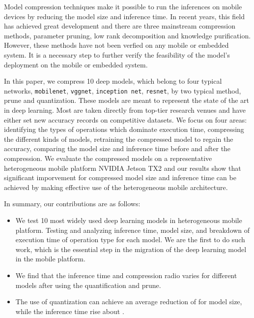 Model compression techniques make it possible to run
the inferences on mobile devices by reducing the model size
and inference time.
In recent years, this field has achieved great development and 
there are three mainstream compression methods,
parameter pruning\FIXME{\cite{}},
low rank decomposition\FIXME{\cite{}} and
knowledge purification\FIXME{\cite{}}.
However, these methods have not 
been verfied on any mobile or embedded system.
It is a necessary step to further verify the
feasibility of the model's deployment on the mobile
or embedded system.

In this paper, we compress 10 deep models, which belong to four typical networks,
\texttt{mobilenet}, \texttt{vggnet}, \texttt{inception net}, \texttt{resnet}, 
by two typical method, prune and quantization.
These models are meant to represent the state of
the art in deep learning. Most are
taken directly from top-tier research venues and have either
set new accuracy records on competitive datasets.
We focus on four areas: identifying the types of operations
which dominate execution time, compressing the different kinds of models,
retraining the compressed model to regain the accuracy,
comparing the model size and inference time before and after the compression.
We evaluate the compressed models 
on a representative heterogeneous mobile platform
NVIDIA Jetson TX2 and our results
show that significant imporvement
for compressed model size and inference time
can be achieved by making effective use of the
heterogeneous mobile architecture. 

In summary, our contributions are as follows:

\begin{itemize}
\item We test 10 most widely used deep
learning models in heterogeneous mobile platform.
Testing and analyzing inference time, model size, and
breakdown of execution time of operation type for each model.
We are the first to do such work,
which is the essential step in the migration of the
deep learning model in the mobile platform.
\item We find that the inference
time and compression radio 
varies for different models after 
using the quantification and prune.
\item The use of quantization can achieve an average 
reduction of  for model size,
while the inference time rise about .

\end{itemize}


